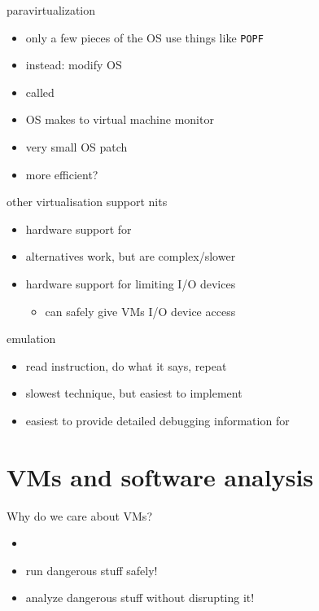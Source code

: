 \begin{frame}{paravirtualization}
    \begin{itemize}
    \item only a few pieces of the OS use things like {\tt POPF}
    \item instead: modify OS
    \item called 
    \item OS makes  to virtual machine monitor
    \item very small OS patch
    \item more efficient?
    \end{itemize}
\end{frame}

\begin{frame}{other virtualisation support nits}
    \begin{itemize}
    \item hardware support for 
    \item alternatives work, but are complex/slower
    \item hardware support for limiting I/O devices
        \begin{itemize}
        \item can safely give VMs I/O device access
        \end{itemize}
    \end{itemize}
\end{frame}

\begin{frame}{emulation}
    \begin{itemize}
    \item read instruction, do what it says, repeat
    \vspace{1cm}
    \item slowest technique, but easiest to implement
    \item easiest to provide detailed debugging information for
    \end{itemize}
\end{frame}


\section{VMs and software analysis}

\begin{frame}{Why do we care about VMs?}
    \begin{itemize}
    \item {}
    \item run dangerous stuff safely!
    \item analyze dangerous stuff without disrupting it!
    \end{itemize}
\end{frame}

